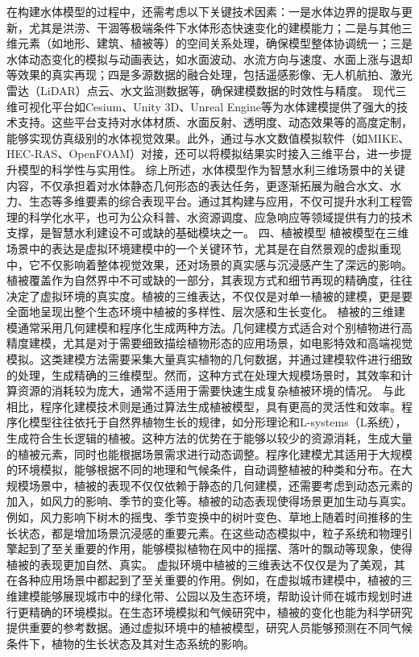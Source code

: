 {{在构建水体模型的过程中，还需考虑以下关键技术因素：一是水体边界的提取与更新，尤其是洪涝、干涸等极端条件下水体形态快速变化的建模能力；二是与其他三维元素（如地形、建筑、植被等）的空间关系处理，确保模型整体协调统一；三是水体动态变化的模拟与动画表达，如水面波动、水流方向与速度、水面上涨与退却等效果的真实再现；四是多源数据的融合处理，包括遥感影像、无人机航拍、激光雷达（LiDAR）点云、水文监测数据等，确保建模数据的时效性与精度。
现代三维可视化平台如Cesium、Unity 3D、Unreal
Engine等为水体建模提供了强大的技术支持。这些平台支持对水体材质、水面反射、透明度、动态效果等的高度定制，能够实现仿真级别的水体视觉效果。此外，通过与水文数值模拟软件（如MIKE、HEC-RAS、OpenFOAM）对接，还可以将模拟结果实时接入三维平台，进一步提升模型的科学性与实用性。
综上所述，水体模型作为智慧水利三维场景中的关键内容，不仅承担着对水体静态几何形态的表达任务，更逐渐拓展为融合水文、水力、生态等多维要素的综合表现平台。通过其构建与应用，不仅可提升水利工程管理的科学化水平，也可为公众科普、水资源调度、应急响应等领域提供有力的技术支撑，是智慧水利建设不可或缺的基础模块之一。
四、植被模型
植被模型在三维场景中的表达是虚拟环境建模中的一个关键环节，尤其是在自然景观的虚拟重现中，它不仅影响着整体视觉效果，还对场景的真实感与沉浸感产生了深远的影响。植被覆盖作为自然界中不可或缺的一部分，其表现方式和细节再现的精确度，往往决定了虚拟环境的真实度。植被的三维表达，不仅仅是对单一植被的建模，更是要全面地呈现出整个生态环境中植被的多样性、层次感和生长变化。
植被的三维建模通常采用几何建模和程序化生成两种方法。几何建模方式适合对个别植物进行高精度建模，尤其是对于需要细致描绘植物形态的应用场景，如电影特效和高端视觉模拟。这类建模方法需要采集大量真实植物的几何数据，并通过建模软件进行细致的处理，生成精确的三维模型。然而，这种方式在处理大规模场景时，其效率和计算资源的消耗较为庞大，通常不适用于需要快速生成复杂植被环境的情况。
与此相比，程序化建模技术则是通过算法生成植被模型，具有更高的灵活性和效率。程序化模型往往依托于自然界植物生长的规律，如分形理论和L-systems（L系统），生成符合生长逻辑的植被。这种方法的优势在于能够以较少的资源消耗，生成大量的植被元素，同时也能根据场景需求进行动态调整。程序化建模尤其适用于大规模的环境模拟，能够根据不同的地理和气候条件，自动调整植被的种类和分布。在大规模场景中，植被的表现不仅仅依赖于静态的几何建模，还需要考虑到动态元素的加入，如风力的影响、季节的变化等。植被的动态表现使得场景更加生动与真实。例如，风力影响下树木的摇曳、季节变换中的树叶变色、草地上随着时间推移的生长状态，都是增加场景沉浸感的重要元素。在这些动态模拟中，粒子系统和物理引擎起到了至关重要的作用，能够模拟植物在风中的摇摆、落叶的飘动等现象，使得植被的表现更加自然、真实。
虚拟环境中植被的三维表达不仅仅是为了美观，其在各种应用场景中都起到了至关重要的作用。例如，在虚拟城市建模中，植被的三维建模能够展现城市中的绿化带、公园以及生态环境，帮助设计师在城市规划时进行更精确的环境模拟。在生态环境模拟和气候研究中，植被的变化也能为科学研究提供重要的参考数据。通过虚拟环境中的植被模型，研究人员能够预测在不同气候条件下，植物的生长状态及其对生态系统的影响。
}}
